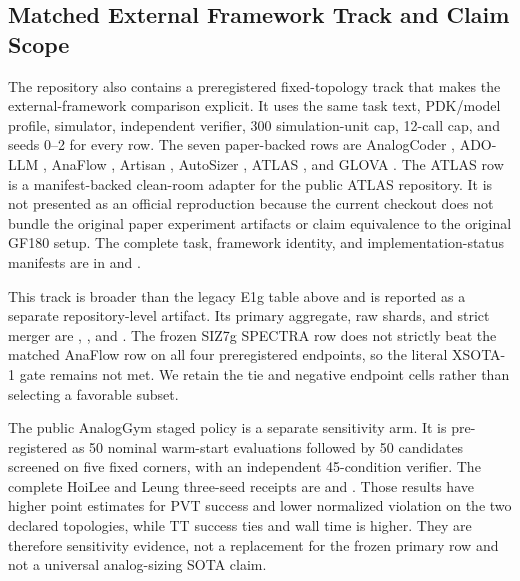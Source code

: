 \subsection{Matched External Framework Track and Claim Scope}
\label{sec:external}

The repository also contains a preregistered fixed-topology track that makes the
external-framework comparison explicit. It uses the same task text, PDK/model
profile, simulator, independent verifier, 300 simulation-unit cap, 12-call cap,
and seeds 0--2 for every row. The seven paper-backed rows are AnalogCoder
\cite{lai2025analogcoder}, ADO-LLM \cite{yin2024adollm}, AnaFlow
\cite{ahmadzadeh2025anaflow}, Artisan \cite{chen2024artisan}, AutoSizer
\cite{yu2026autosizer}, ATLAS \cite{oh2026atlas}, and GLOVA
\cite{kim2025glova}. The ATLAS row is a manifest-backed clean-room adapter
for the public ATLAS repository. It is not presented as an official
reproduction because the current checkout does not bundle the original paper
experiment artifacts or claim equivalence to the original GF180 setup.
The complete task, framework identity, and implementation-status manifests are
in  and
.

This track is broader than the legacy E1g table above and is reported as a
separate repository-level artifact. Its primary aggregate, raw shards, and
strict merger are ,
, and
. The frozen SIZ7g SPECTRA row does not
strictly beat the matched AnaFlow row on all four preregistered endpoints, so
the literal XSOTA-1 gate remains not met. We retain the tie and negative
endpoint cells rather than selecting a favorable subset.

The public AnalogGym staged policy is a separate sensitivity arm. It is
pre-registered as 50 nominal warm-start evaluations followed by 50 candidates
screened on five fixed corners, with an independent 45-condition verifier.
The complete HoiLee and Leung three-seed receipts are
 and
. Those results
have higher point estimates for PVT success and lower normalized violation on the two declared topologies,
while TT success ties and wall time is higher. They are therefore sensitivity
evidence, not a replacement for the frozen primary row and not a universal
analog-sizing SOTA claim.

